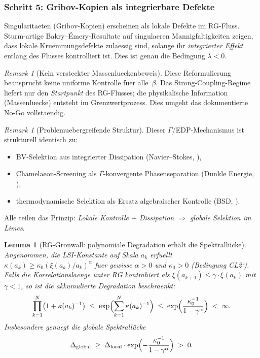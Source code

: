 \documentclass[12pt,a4paper]{article}
\theoremstyle{definition}
\theoremstyle{plain}
\newtheorem{lemma}[definition]{Lemma}
\theoremstyle{remark}
\newtheorem{remark}[definition]{Remark}
\begin{document}
\subsubsection*{Schritt 5: Gribov-Kopien als integrierbare Defekte}

Singularitaeten (Gribov-Kopien) erscheinen als lokale Defekte im RG-Fluss. Sturm-artige Bakry--\'Emery-Resultate auf singulaeren Mannigfaltigkeiten \cite{Sturm2025} zeigen, dass lokale Kruemmungsdefekte zulaessig sind, solange ihr \emph{integrierter Effekt} entlang des Flusses kontrolliert ist. Dies ist genau die Bedingung $\lambda < 0$.

\begin{remark}[Kein versteckter Massenlueckenbeweis]\label{rem:no-hidden-proof}
Diese Reformulierung beansprucht keine uniforme Kontrolle fuer alle~$\beta$. Das Strong-Coupling-Regime liefert nur den \emph{Startpunkt} des RG-Flusses; die physikalische Information (Massenluecke) entsteht im Grenzwertprozess. Dies umgeht das dokumentierte No-Go vollstaendig.
\end{remark}

\begin{remark}[Problemuebergreifende Struktur]\label{rem:cross-edp-ym}
Dieser $\Gamma$/EDP-Mechanismus ist strukturell identisch zu:
\begin{itemize}
\item BV-Selektion aus integrierter Dissipation (Navier--Stokes, \cite{FST-NS2026}),
\item Chamelaeon-Screening als $\Gamma$-konvergente Phasenseparation (Dunkle Energie, \cite{Geiger2026-DE}),
\item thermodynamische Selektion als Ersatz algebraischer Kontrolle (BSD, \cite{Geiger2026-BSD}).
\end{itemize}
Alle teilen das Prinzip: \emph{Lokale Kontrolle $+$ Dissipation $\Rightarrow$ globale Selektion im Limes}.
\end{remark}

\begin{lemma}[RG-Gronwall: polynomiale Degradation erh\"{a}lt die Spektrall\"{u}cke]\label{lem:rg-gronwall}
Angenommen, die LSI-Konstante auf Skala $a_k$ erfuellt $\kappa(a_k) \geq \kappa_0 (\xi(a_k)/a_k)^\alpha$ fuer gewisse $\alpha > 0$ und $\kappa_0 > 0$ (Bedingung CL2'). Falls die Korrelationslaenge unter RG kontrahiert als $\xi(a_{k+1}) \leq \gamma \cdot \xi(a_k)$ mit $\gamma < 1$, so ist die akkumulierte Degradation beschraenkt:
\begin{equation}\label{eq:rg-gronwall}
  \prod_{k=1}^{N} \bigl(1 + \kappa(a_k)^{-1}\bigr) \;\leq\; \exp\Bigl(\sum_{k=1}^{N} \kappa(a_k)^{-1}\Bigr) \;\leq\; \exp\Bigl(\frac{\kappa_0^{-1}}{1 - \gamma^\alpha}\Bigr) \;<\; \infty.
\end{equation}
Insbesondere genuegt die globale Spektrall\"{u}cke
\[
  \Delta_{\mathrm{global}} \;\geq\; \Delta_{\mathrm{local}} \cdot \exp\Bigl(-\frac{\kappa_0^{-1}}{1 - \gamma^\alpha}\Bigr) \;>\; 0.
\]
\end{lemma}
\end{document}
